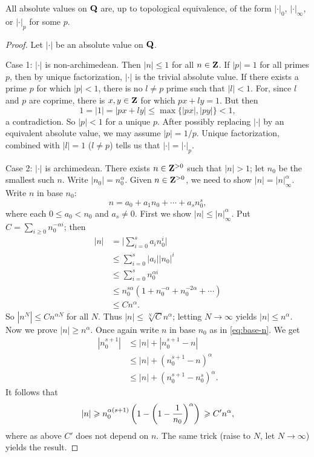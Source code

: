 \begin{theorem}[Ostrowski]\label{thm:ostrowski}
All absolute values on $\mathbf{Q}$ are, up to topological equivalence, of the form 
$|\cdot|_0$, $|\cdot|_\infty$, or $|\cdot|_p$ for some $p$. 
\end{theorem}
\begin{proof}
Let $|\cdot|$ be an absolute value on $\mathbf{Q}$. 

Case 1: $|\cdot|$ is non-archimedean. Then $|n|\leqslant 1$ for all $n\in \mathbf{Z}$. 
If $|p|=1$ for all primes $p$, then by unique factorization, $|\cdot|$ is the 
trivial absolute value. If there exists a prime $p$ for which $|p|<1$, there is 
no $l\ne p$ prime such that $|l|<1$. For, since $l$ and $p$ are coprime, there 
is $x,y\in \mathbf{Z}$ for which $p x+l y=1$. But then 
\[
  1 = |1| = |p x+l y| \leqslant \max\{|p x|,|p y|\} < 1 ,
\]
a contradiction. So $|p|<1$ for a unique $p$. After possibly replacing 
$|\cdot|$ by an equivalent absolute value, we may assume $|p|=1/p$. Unique 
factorization, combined with $|l|=1$ ($l\ne p$) tells us that 
$|\cdot|=|\cdot|_p$. 

Case 2: $|\cdot|$ is archimedean. There exists $n\in \mathbf{Z}^{>0}$ such that 
$|n|>1$; let $n_0$ be the smallest such $n$. Write $|n_0|=n_0^\alpha$. Given 
$n\in \mathbf{Z}^{>0}$, we need to show $|n|=|n|_\infty^\alpha$. Write $n$ in base $n_0$: 
\begin{equation}\label{eq:base-n}
  n = a_0 + a_1 n_0 + \cdots + a_s n_0^s ,
\end{equation}
where each $0\leqslant a_0<n_0$ and $a_s\ne 0$. First we show 
$|n|\leqslant |n|_\infty^\alpha$. Put $C=\sum_{i\geqslant 0} n_0^{-\alpha i}$; 
then 
\begin{align*}
  |n| 
    &= \bigg|\sum_{i=0}^s a_i n_0^i\bigg| \\
    &\leqslant \sum_{i=0}^s |a_i| |n_0|^i \\
    &\leqslant \sum_{i=0}^s n_0^{\alpha i} \\
    &\leqslant n_0^{s\alpha} (1+n_0^{-\alpha} + n_0^{-2\alpha} + \cdots) \\
    &\leqslant C n^\alpha .
\end{align*}
So $|n^N|\leqslant C n^{\alpha N}$ for all $N$. Thus 
$|n|\leqslant \sqrt[N]{C} n^\alpha$; letting $N\to \infty$ yields 
$|n|\leqslant n^\alpha$. Now we prove $|n|\geqslant n^\alpha$. Once again 
write $n$ in base $n_0$ as in \eqref{eq:base-n}. We get 
\begin{align*}
  |n_0^{s+1}| 
    &\leqslant |n|+|n_0^{s+1}-n| \\
    &\leqslant |n|+(n_0^{s+1}-n)^\alpha \\
    &\leqslant |n|+(n_0^{s+1}-n_0^s)^\alpha .
\end{align*}
It follows that
\[
  |n| 
    \geqslant n_0^{\alpha(s+1)} \left(1-\left(1-\frac{1}{n_0}\right)^\alpha\right) \\
    \geqslant C' n^\alpha ,
\]
where as above $C'$ does not depend on $n$. The same trick (raise to $N$, let 
$N\to \infty$) yields the result. 
\end{proof}

